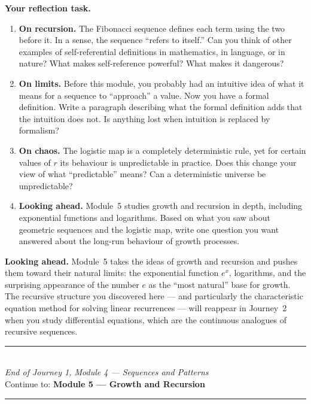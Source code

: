 \documentclass[12pt, a4paper]{article}
\begin{document}
\begin{reflectionbox}
\textbf{Your reflection task.}

\begin{enumerate}
  \item \textbf{On recursion.} The Fibonacci sequence defines each term using the two before it. In a sense, the sequence ``refers to itself.'' Can you think of other examples of self-referential definitions in mathematics, in language, or in nature? What makes self-reference powerful? What makes it dangerous?

  \item \textbf{On limits.} Before this module, you probably had an intuitive idea of what it means for a sequence to ``approach'' a value. Now you have a formal definition. Write a paragraph describing what the formal definition adds that the intuition does not. Is anything lost when intuition is replaced by formalism?

  \item \textbf{On chaos.} The logistic map is a completely deterministic rule, yet for certain values of $r$ its behaviour is unpredictable in practice. Does this change your view of what ``predictable'' means? Can a deterministic universe be unpredictable?

  \item \textbf{Looking ahead.} Module~5 studies growth and recursion in depth, including exponential functions and logarithms. Based on what you saw about geometric sequences and the logistic map, write one question you want answered about the long-run behaviour of growth processes.
\end{enumerate}
\end{reflectionbox}

\medskip
\noindent\textbf{Looking ahead.}
Module~5 takes the ideas of growth and recursion and pushes them toward their natural limits: the exponential function $e^x$, logarithms, and the surprising appearance of the number $e$ as the ``most natural'' base for growth. The recursive structure you discovered here --- and particularly the characteristic equation method for solving linear recurrences --- will reappear in Journey~2 when you study differential equations, which are the continuous analogues of recursive sequences.

\vspace{1.4cm}
\begin{center}
{\color{MidBlue}\rule{0.5\linewidth}{0.8pt}}\\[6pt]
{\small\color{DarkGrey}\textit{End of Journey 1, Module 4 --- Sequences and Patterns}}\\[4pt]
{\small\color{DarkGrey}Continue to: \textbf{Module 5 --- Growth and Recursion}}\\[6pt]
{\color{MidBlue}\rule{0.5\linewidth}{0.8pt}}
\end{center}
\end{document}

